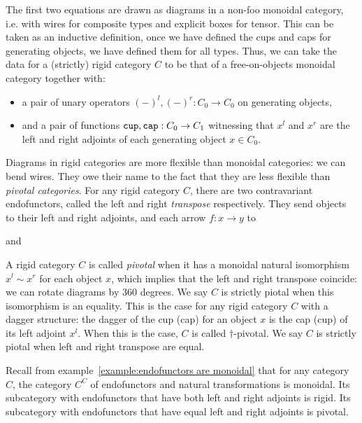 The first two equations are drawn as diagrams in a non-foo monoidal category, i.e. with wires for composite types and explicit boxes for tensor.
This can be taken as an inductive definition, once we have defined the cups and caps for generating objects, we have defined them for all types.
Thus, we can take the data for a (strictly) rigid category $C$ to be that of a free-on-objects monoidal category together with:
\begin{itemize}
    \item a pair of unary operators $(-)^l, (-)^r : C_0 \to C_0$ on generating objects,
    \item and a pair of functions $\mathtt{cup}, \mathtt{cap} : C_0 \to C_1$ witnessing that $x^l$ and $x^r$ are the left and right adjoints of each generating object $x \in C_0$.
\end{itemize}
Diagrams in rigid categories are more flexible than monoidal categories: we can bend wires.
They owe their name to the fact that they are less flexible than \emph{pivotal categories}.
For any rigid category $C$, there are two contravariant endofunctors, called the left and right \emph{transpose} respectively.
They send objects to their left and right adjoints, and each arrow $f : x \to y$ to
\begin{center}
\hspace{50pt} and \hspace{50pt}
\end{center}
A rigid category $C$ is called \emph{pivotal} when it has a monoidal natural isomorphism $x^l \sim x^r$ for each object $x$, which implies that the left and right transpose coincide: we can rotate diagrams by 360 degrees.
We say $C$ is strictly piotal when this isomorphism is an equality.
This is the case for any rigid category $C$ with a dagger structure: the dagger of the cup (cap) for an object $x$ is the cap (cup) of its left adjoint $x^l$.
When this is the case, $C$ is called $\dagger$-pivotal.
We say $C$ is strictly piotal when left and right transpose are equal.

\begin{example}
Recall from example~\ref{example:endofunctors are monoidal} that for any category $C$, the category $C^C$ of endofunctors and natural transformations is monoidal.
Its subcategory with endofunctors that have both left and right adjoints is rigid.
Its subcategory with endofunctors that have equal left and right adjoints is pivotal.
\end{example}

